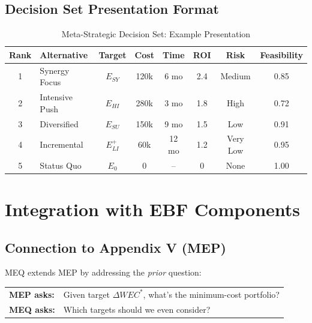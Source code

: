 \subsection{Decision Set Presentation Format}

\begin{table}[H]
\centering
\caption{Meta-Strategic Decision Set: Example Presentation}
\label{tab:meq-decision-example}
\renewcommand{\arraystretch}{1.3}
\small
\begin{tabular}{@{}clcccccc@{}}
\toprule
\textbf{Rank} & \textbf{Alternative} & \textbf{Target} & \textbf{Cost} & \textbf{Time} & \textbf{ROI} & \textbf{Risk} & \textbf{Feasibility} \\
\midrule
1 & Synergy Focus & $E_{SY}$ & 120k & 6 mo & 2.4 & Medium & 0.85 \\
2 & Intensive Push & $E_{HI}$ & 280k & 3 mo & 1.8 & High & 0.72 \\
3 & Diversified & $E_{SU}$ & 150k & 9 mo & 1.5 & Low & 0.91 \\
4 & Incremental & $E_{LI}^+$ & 60k & 12 mo & 1.2 & Very Low & 0.95 \\
5 & Status Quo & $E_0$ & 0 & -- & 0 & None & 1.00 \\
\bottomrule
\end{tabular}
\end{table}

\section{Integration with EBF Components}
\label{sec:meq-integration}

\subsection{Connection to Appendix V (MEP)}

MEQ extends MEP by addressing the \textit{prior} question:

\begin{center}
\begin{tabular}{ll}
\textbf{MEP asks:} & Given target $\Delta WEC^*$, what's the minimum-cost portfolio? \\
\textbf{MEQ asks:} & Which targets should we even consider?
\end{tabular}
\end{center}


